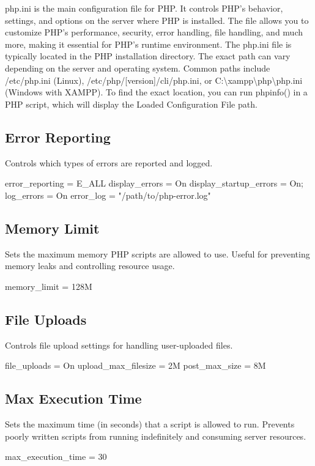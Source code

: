 \documentclass{report}
\begin{document}
    \pagebreak 
    \bigbreak \noindent 
    php.ini is the main configuration file for PHP. It controls PHP's behavior, settings, and options on the server where PHP is installed. The file allows you to customize PHP's performance, security, error handling, file handling, and much more, making it essential for PHP's runtime environment.
    \bigbreak \noindent 
    The php.ini file is typically located in the PHP installation directory.
    \bigbreak \noindent 
    The exact path can vary depending on the server and operating system. Common paths include /etc/php.ini (Linux), /etc/php/[version]/cli/php.ini, or C:\textbackslash xampp\textbackslash php\textbackslash php.ini (Windows with XAMPP).
    \bigbreak \noindent 
    To find the exact location, you can run phpinfo() in a PHP script, which will display the Loaded Configuration File path.
    \bigbreak \noindent 
    \subsection{Error Reporting}
    \bigbreak \noindent 
    Controls which types of errors are reported and logged.
    \bigbreak \noindent 
    \begin{phpcode}
        error_reporting = E_ALL
        display_errors = On
        display_startup_errors = On;
        log_errors = On
        error_log = "/path/to/php-error.log"
    \end{phpcode}
    \bigbreak \noindent 
    \subsection{Memory Limit}
    \bigbreak \noindent 
    Sets the maximum memory PHP scripts are allowed to use. Useful for preventing memory leaks and controlling resource usage.
    \bigbreak \noindent 
    \begin{phpcode}
    memory_limit = 128M
    \end{phpcode}
    \bigbreak \noindent 
    \subsection{File Uploads}
    \bigbreak \noindent 
    Controls file upload settings for handling user-uploaded files.
    \bigbreak \noindent 
    \begin{phpcode}
        file_uploads = On
        upload_max_filesize = 2M
        post_max_size = 8M
    \end{phpcode}
    \bigbreak \noindent 
    \subsection{Max Execution Time}
    \bigbreak \noindent 
    Sets the maximum time (in seconds) that a script is allowed to run.
    \bigbreak \noindent 
    Prevents poorly written scripts from running indefinitely and consuming server resources.
    \bigbreak \noindent 
    \begin{phpcode}
    max_execution_time = 30
    \end{phpcode}
    \bigbreak \noindent 
\end{document}

